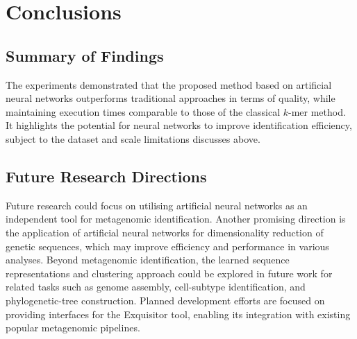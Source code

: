 \documentclass[biomedinformatics,article,submit,moreauthors]{Definitions/mdpi}
\begin{document}

    \section{Conclusions}
        \subsection{Summary of Findings}
            The experiments demonstrated that the proposed method based on artificial neural networks outperforms traditional approaches in terms of quality, while maintaining execution times comparable to those of the classical $k$-mer method.
            It highlights the potential for neural networks to improve identification efficiency, subject to the dataset and scale limitations discusses above.

        \subsection{Future Research Directions}
            Future research could focus on utilising artificial neural networks as an independent tool for metagenomic identification. Another promising direction is the application of artificial neural networks for dimensionality reduction of genetic sequences, which may improve efficiency and performance in various analyses.
            Beyond metagenomic identification, the learned sequence representations and clustering approach could be explored in future work for related tasks such as genome assembly, cell-subtype identification, and phylogenetic-tree construction.
            Planned development efforts are focused on providing interfaces for the Exquisitor tool, enabling its integration with existing popular metagenomic pipelines.
\end{document}
